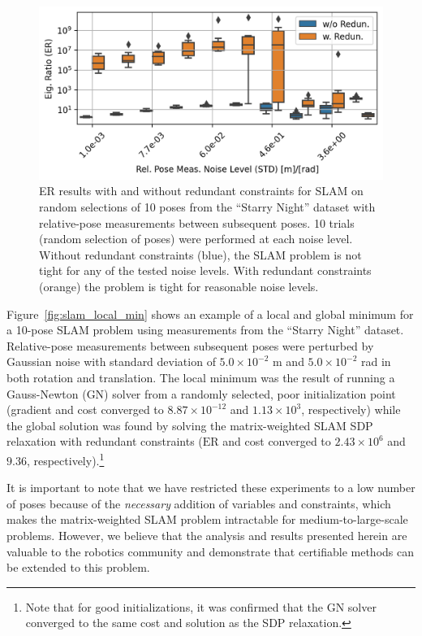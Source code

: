 \documentclass[lettersize,journal]{IEEEtran}
\begin{document}
\begin{figure}[!b]
	\centering
	\includegraphics[width=\columnwidth]{figs/d3_slam_redun_box}
	\caption{ER  results with and without redundant constraints for SLAM on random selections of 10 poses from the ``Starry Night'' dataset with relative-pose measurements between subsequent poses. 10 trials (random selection of poses) were performed at each noise level. Without redundant constraints (blue), the SLAM problem is not tight for any of the tested noise levels. With redundant constraints (orange) the problem is tight for reasonable noise levels.}
	\label{fig:d3_slam_box}
\end{figure}

Figure~\ref{fig:slam_local_min} shows an example of a local and global minimum for a 10-pose SLAM problem using measurements from the ``Starry Night'' dataset. Relative-pose measurements between subsequent poses were perturbed by Gaussian noise with standard deviation of $5.0 \times 10^{-2}$ m and $5.0 \times 10^{-2}$ rad in both rotation and translation. The local minimum was the result of running a Gauss-Newton (GN) solver from a randomly selected, poor initialization point (gradient and cost converged to $8.87\times10^{-12}$ and $1.13\times10^3$, respectively) while the global solution was found by solving the matrix-weighted SLAM SDP relaxation with redundant constraints ($\mbox{ER}$ and cost converged to $2.43\times10^6$ and $9.36$, respectively).\footnote{Note that for good initializations, it was confirmed that the GN solver converged to the same cost and solution as the SDP relaxation.} 

It is important to note that we have restricted these experiments to a low number of poses because of the \emph{necessary} addition of variables and constraints, which makes the matrix-weighted SLAM problem intractable for medium-to-large-scale problems. However, we believe that the analysis and results presented herein are valuable to the robotics community and demonstrate that certifiable methods can be extended to this problem.
\end{document}
